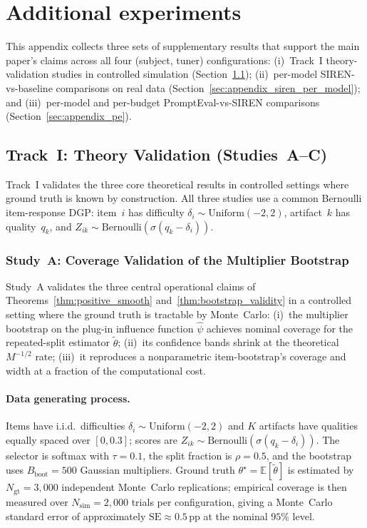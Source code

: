 \section{Additional experiments}\label{sec:additional_experiments}

This appendix collects three sets of supplementary results that support the
main paper's claims across all four (subject, tuner) configurations:
(i)~Track~I theory-validation studies in controlled simulation
(Section~\ref{sec:track1});
(ii)~per-model SIREN-vs-baseline comparisons on real data
(Section~\ref{sec:appendix_siren_per_model}); and
(iii)~per-model and per-budget PromptEval-vs-SIREN comparisons
(Section~\ref{sec:appendix_pe}).

\FloatBarrier


\subsection{Track~I: Theory Validation (Studies~A--C)}\label{sec:track1}

Track~I validates the three core theoretical results in controlled settings where ground truth is known by construction.
All three studies use a common Bernoulli item-response DGP: item~$i$ has difficulty $\delta_i \sim \mathrm{Uniform}(-2,2)$, artifact~$k$ has quality~$q_k$, and $Z_{ik} \sim \mathrm{Bernoulli}(\sigma(q_k - \delta_i))$.

\subsubsection{Study~A: Coverage Validation of the Multiplier Bootstrap}
\label{sec:studyA}

Study~A validates the three central operational claims of Theorems~\ref{thm:positive_smooth} and~\ref{thm:bootstrap_validity} in a controlled setting where the ground truth is tractable by Monte~Carlo: (i)~the multiplier bootstrap on the plug-in influence function $\widehat\psi$ achieves nominal coverage for the repeated-split estimator $\widetilde\theta$; (ii)~its confidence bands shrink at the theoretical $M^{-1/2}$ rate; (iii)~it reproduces a nonparametric item-bootstrap's coverage and width at a fraction of the computational cost.

\paragraph{Data generating process.}
Items have i.i.d.\ difficulties $\delta_i\sim\text{Uniform}(-2,2)$ and $K$ artifacts have qualities equally spaced over $[0, 0.3]$; scores are $Z_{ik}\sim\text{Bernoulli}(\sigma(q_k-\delta_i))$.
The selector is softmax with $\tau{=}0.1$, the split fraction is $\rho{=}0.5$, and the bootstrap uses $B_{\mathrm{boot}}{=}500$ Gaussian multipliers.
Ground truth $\theta^\star = \mathbb E[\widetilde\theta]$ is estimated by $N_{\mathrm{gt}}{=}3{,}000$ independent Monte~Carlo replications; empirical coverage is then measured over $N_{\mathrm{sim}}{=}2{,}000$ trials per configuration, giving a Monte~Carlo standard error of approximately $\mathrm{SE}\approx 0.5$\,pp at the nominal $95\%$ level.

